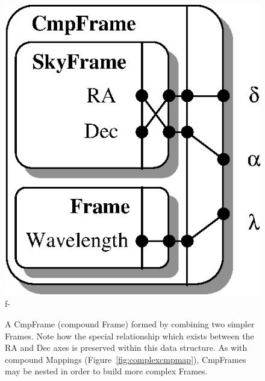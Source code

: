 \documentclass[twoside,11pt]{article}
\newenvironment{latexonly}{}{}
\begin{document}
\begin{latexonly}
\begin{figure}
\begin{center}
   \includegraphics[scale=0.85]{sun210_figures/cmpframe.eps}
f-
   \caption{A CmpFrame (compound Frame) formed by combining two simpler
   Frames. Note how the special relationship which exists between the RA
   and Dec axes is preserved within this data structure. As with compound
   Mappings (Figure~\ref{fig:complexcmpmap}), CmpFrames may be nested in
   order to build more complex Frames.}
   \label{fig:cmpframe}
   \end{center}
   \end{figure}
\end{latexonly}
\end{document}
